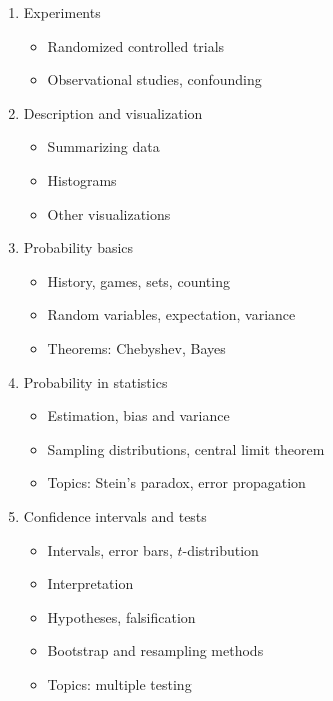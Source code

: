 \documentclass[11pt]{article}
\begin{document}
\begin{enumerate}
\item Experiments

  \begin{itemize}
  \item Randomized controlled trials
  \item Observational studies, confounding
  \end{itemize}
  
\item Description and visualization

  \begin{itemize}
  \item Summarizing data
  \item Histograms
  \item Other visualizations
  \end{itemize}
  
\item Probability basics

  \begin{itemize}
  \item History, games, sets, counting
  \item Random variables, expectation, variance
  \item Theorems: Chebyshev, Bayes
  \end{itemize}
  
\item Probability in statistics

  \begin{itemize}
  \item Estimation, bias and variance
  \item Sampling distributions, central limit theorem
  \item Topics: Stein's paradox, error propagation
  \end{itemize}
  
\item Confidence intervals and tests

  \begin{itemize}
  \item Intervals, error bars, $t$-distribution
  \item Interpretation
  \item Hypotheses, falsification
  \item Bootstrap and resampling methods
  \item Topics: multiple testing
  \end{itemize}
  

\end{enumerate}
\end{document}
